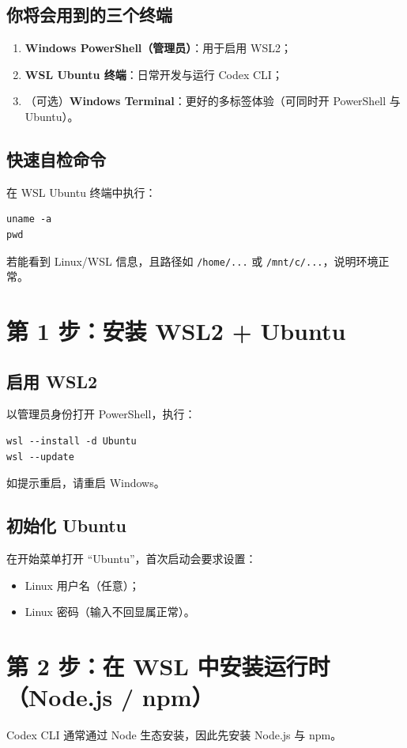 \documentclass[11pt,a4paper]{article}
\begin{document}
\subsection{你将会用到的三个终端}
\begin{enumerate}[leftmargin=1.7em]
  \item \textbf{Windows PowerShell（管理员）}：用于启用 WSL2；
  \item \textbf{WSL Ubuntu 终端}：日常开发与运行 Codex CLI；
  \item （可选）\textbf{Windows Terminal}：更好的多标签体验（可同时开 PowerShell 与 Ubuntu）。
\end{enumerate}

\subsection{快速自检命令}
在 WSL Ubuntu 终端中执行：
\begin{lstlisting}
uname -a
pwd
\end{lstlisting}
若能看到 Linux/WSL 信息，且路径如 \texttt{/home/...} 或 \texttt{/mnt/c/...}，说明环境正常。

\section{第 1 步：安装 WSL2 + Ubuntu}
\subsection{启用 WSL2}
以管理员身份打开 PowerShell，执行：
\begin{lstlisting}
wsl --install -d Ubuntu
wsl --update
\end{lstlisting}
如提示重启，请重启 Windows。

\subsection{初始化 Ubuntu}
在开始菜单打开 ``Ubuntu''，首次启动会要求设置：
\begin{itemize}[leftmargin=1.5em]
  \item Linux 用户名（任意）；
  \item Linux 密码（输入不回显属正常）。
\end{itemize}

\section{第 2 步：在 WSL 中安装运行时（Node.js / npm）}
Codex CLI 通常通过 Node 生态安装，因此先安装 Node.js 与 npm。
\end{document}
